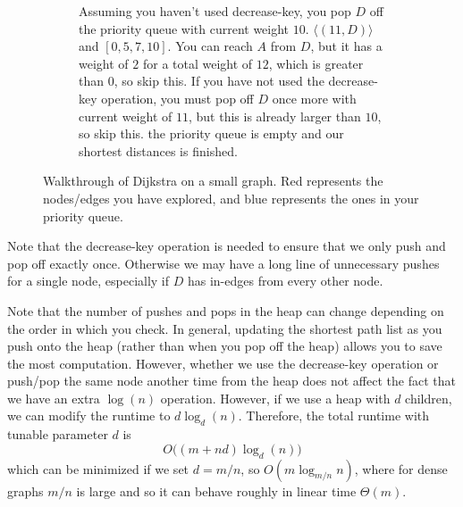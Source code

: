 \begin{example}
\begin{figure}[H]
\begin{subfigure}[b]{0.48\textwidth}
        \caption{Assuming you haven't used decrease-key, you pop $D$ off the priority queue with current weight $10$. $\langle (11, D) \rangle$ and $[0, 5, 7, 10]$. You can reach $A$ from $D$, but it has a weight of $2$ for a total weight of $12$, which is greater than $0$, so skip this. If you have not used the decrease-key operation, you must pop off $D$ once more with current weight of $11$, but this is already larger than $10$, so skip this. the priority queue is empty and our shortest distances is finished. }
      \end{subfigure}

      \caption{Walkthrough of Dijkstra on a small graph. Red represents the nodes/edges you have explored, and blue represents the ones in your priority queue. }
      \label{fig:dijkstra_algo}
    \end{figure}

    Note that the decrease-key operation is needed to ensure that we only push and pop off exactly once. Otherwise we may have a long line of unnecessary pushes for a single node, especially if $D$ has in-edges from every other node.  
  \end{example}

  Note that the number of pushes and pops in the heap can change depending on the order in which you check. In general, updating the shortest path list as you push onto the heap (rather than when you pop off the heap) allows you to save the most computation. However, whether we use the decrease-key operation or push/pop the same node another time from the heap does not affect the fact that we have an extra $\log(n)$ operation. However, if we use a heap with $d$ children, we can modify the runtime to $d \log_d (n)$. Therefore, the total runtime with tunable parameter $d$ is 
  \begin{equation}
    O\big( (m + nd) \log_d (n)\big)
  \end{equation}
  which can be minimized if we set $d = m/n$, so $O(m \log_{m/n} n)$, where for dense graphs $m/n$ is large and so it can behave roughly in linear time $\Theta(m)$. 

